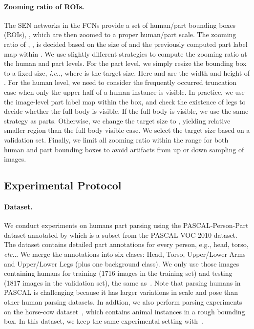 \documentclass[runningheads]{llncs}
\makeatletter
\DeclareRobustCommand\onedot{\futurelet\@let@token\@onedot}
\def\@onedot{\ifx\@let@token.\else.\null\fi\xspace}
\def\ie{\emph{i.e}\onedot} \def\Ie{\emph{I.e}\onedot}
\def\etc{\emph{etc}\onedot} \def\vs{\emph{vs}\onedot}
\makeatother
\begin{document}
\paragraph{Zooming ratio of ROIs.}
The SEN networks in the FCNs provide a set of human/part bounding boxes (ROIs), , which are then zoomed to a proper human/part scale. The zooming ratio of , , is decided based on the size of  and the previously computed part label map  within . We use slightly different strategies to compute the zooming ratio at the human and part levels. 
For the part level, we simply resize the bounding box to a fixed size, \ie , where  is the target size. Here  and  are the width and height of . 
For the human level, we need to consider the frequently occurred truncation case when only the upper half of a human instance is visible. 
In practice, we use the image-level part label map  within the box, and check the existence of legs to decide whether the full body is visible. If the full body is visible, we use the same strategy as parts. Otherwise, we change the target size  to , yielding relative smaller region than the full body visible case. We select the target size based on a validation set. 
Finally, we limit all zooming ratio  within the range  for both human and part bounding boxes to avoid artifacts from up or down sampling of images.














\vspace{-0.7\baselineskip}
\subsection{Experimental Protocol}
\paragraph{Dataset.} We conduct experiments on humans part parsing using the PASCAL-Person-Part dataset annotated by \cite{chen2014detect} which is a subset from the PASCAL VOC 2010 dataset.  The dataset contains detailed part annotations for every person, e.g., head, torso, \etc. We merge the annotations into six clases: Head, Torso, Upper/Lower Arms and Upper/Lower Legs (plus one background class). 
We only use those images containing humans for training (1716 images in the training set) and testing (1817 images in the validation set), the same as~\cite{chen2015attention}. Note that parsing humans in PASCAL is challenging because it has larger variations in scale and pose than other human parsing datasets. 
In addtion, we also perform parsing experiments on the horse-cow dataset~\cite{wang2014semantic}, which contains animal instances in a rough bounding box. In this dataset, we keep the same experimental setting with~\cite{wang2015joint}.
\end{document}
